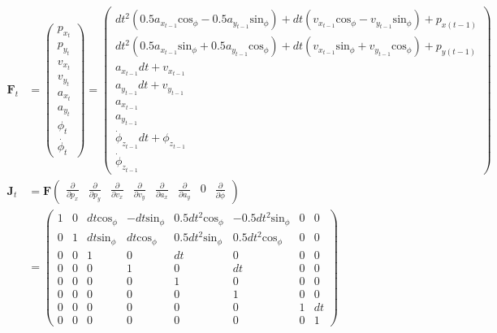 \documentclass{article}
\begin{document}
\begin{align}
 \textbf{F}_{t} &=
 \left(\begin{matrix}
  p_{x_t} \\
  p_{y_t} \\
  v_{x_t} \\
  v_{y_t} \\
  a_{x_t} \\
  a_{y_t} \\
  \phi_t \\
  \dot{\phi_t}
 \end{matrix}\right)
 = \left(\begin{matrix}dt^{2} \left(0.5 a_{x_{t-1}} \textrm{cos}_\phi - 0.5 a_{y_{t-1}} \textrm{sin}_\phi\right) + dt \left(v_{x_{t-1}} \textrm{cos}_\phi - v_{y_{t-1}} \textrm{sin}_\phi\right) + p_{x (t-1)}\\dt^{2} \left(0.5 a_{x_{t-1}} \textrm{sin}_\phi + 0.5 a_{y_{t-1}} \textrm{cos}_\phi\right) + dt \left(v_{x_{t-1}} \textrm{sin}_\phi + v_{y_{t-1}} \textrm{cos}_\phi\right) + p_{y (t-1)}\\a_{x_{t-1}} dt + v_{x_{t-1}}\\a_{y_{t-1}} dt + v_{y_{t-1}}\\a_{x_{t-1}}\\a_{y_{t-1}}\\\dot{\phi}_{z_{t-1}} dt + \phi_{z_{t-1}}\\\dot{\phi}_{z_{t-1}}\end{matrix}\right) \\
  \textbf{J}_t &= 
  \textbf{F}\left(\begin{matrix}
    \frac{\partial}{\partial p_x} & \frac{\partial}{\partial p_y} & \frac{\partial}{\partial v_x} & \frac{\partial}{\partial v_y} & \frac{\partial}{\partial a_x} & \frac{\partial}{\partial a_y} & 0 & \frac{\partial}{\partial \dot{\phi}}
  \end{matrix}\right) \\
  &= \left(\begin{matrix}1 & 0 & dt \textrm{cos}_\phi & - dt \textrm{sin}_\phi & 0.5 dt^{2} \textrm{cos}_\phi & - 0.5 dt^{2} \textrm{sin}_\phi & 0 & 0\\0 & 1 & dt \textrm{sin}_\phi & dt \textrm{cos}_\phi & 0.5 dt^{2} \textrm{sin}_\phi & 0.5 dt^{2} \textrm{cos}_\phi & 0 & 0\\0 & 0 & 1 & 0 & dt & 0 & 0 & 0\\0 & 0 & 0 & 1 & 0 & dt & 0 & 0\\0 & 0 & 0 & 0 & 1 & 0 & 0 & 0\\0 & 0 & 0 & 0 & 0 & 1 & 0 & 0\\0 & 0 & 0 & 0 & 0 & 0 & 1 & dt\\0 & 0 & 0 & 0 & 0 & 0 & 0 & 1\end{matrix}\right)
\end{align}
\end{document}
